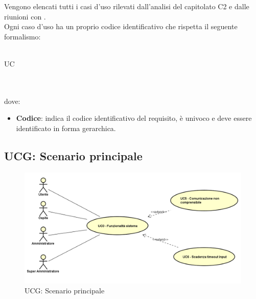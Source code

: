 Vengono elencati tutti i casi d'uso rilevati dall'analisi del capitolato C2 e dalle riunioni con \PROPONENTE. \\
Ogni caso d'uso ha un proprio codice identificativo  che rispetta il seguente formalismo:\\ \\
\centerline{UC\textbraceright{}}
\\ \\dove:
\begin{itemize}
	\item \textbf{Codice}: indica il codice identificativo del requisito, è univoco e deve essere identificato in forma gerarchica.
\end{itemize}

\subsection{UCG: Scenario principale}
\label{UCG}
\begin{figure}[h]
\centering
\includegraphics[width=\textwidth,height=\textheight,keepaspectratio]{images/UseCaseUCG.png}
\caption{UCG: Scenario principale}
\end{figure}
